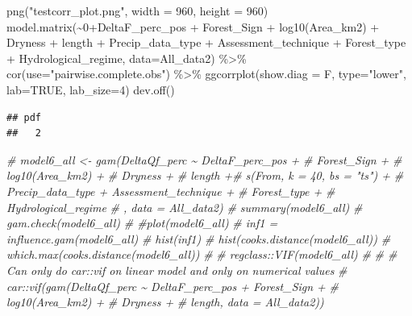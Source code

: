 \documentclass[]{elsarticle} %
\newenvironment{Shaded}{\begin{snugshade}}{\end{snugshade}}
\newcommand{\AttributeTok}[1]{\textcolor[rgb]{0.77,0.63,0.00}{#1}}
\newcommand{\CommentTok}[1]{\textcolor[rgb]{0.56,0.35,0.01}{\textit{#1}}}
\newcommand{\ConstantTok}[1]{\textcolor[rgb]{0.00,0.00,0.00}{#1}}
\newcommand{\DecValTok}[1]{\textcolor[rgb]{0.00,0.00,0.81}{#1}}
\newcommand{\FunctionTok}[1]{\textcolor[rgb]{0.00,0.00,0.00}{#1}}
\newcommand{\NormalTok}[1]{#1}
\newcommand{\SpecialCharTok}[1]{\textcolor[rgb]{0.00,0.00,0.00}{#1}}
\newcommand{\StringTok}[1]{\textcolor[rgb]{0.31,0.60,0.02}{#1}}
\begin{document}
\begin{Shaded}
\begin{Highlighting}[]
\FunctionTok{png}\NormalTok{(}\StringTok{"testcorr\_plot.png"}\NormalTok{, }\AttributeTok{width =} \DecValTok{960}\NormalTok{, }\AttributeTok{height =} \DecValTok{960}\NormalTok{)}
\FunctionTok{model.matrix}\NormalTok{(}\SpecialCharTok{\textasciitilde{}}\DecValTok{0}\SpecialCharTok{+}\NormalTok{DeltaF\_perc\_pos }\SpecialCharTok{+} 
\NormalTok{                    Forest\_Sign }\SpecialCharTok{+} 
                   \FunctionTok{log10}\NormalTok{(Area\_km2) }\SpecialCharTok{+} 
\NormalTok{                    Dryness }\SpecialCharTok{+} 
\NormalTok{                    length }\SpecialCharTok{+}
\NormalTok{                    Precip\_data\_type }\SpecialCharTok{+}\NormalTok{  Assessment\_technique }\SpecialCharTok{+}
\NormalTok{                    Forest\_type }\SpecialCharTok{+}
\NormalTok{                    Hydrological\_regime, }\AttributeTok{data=}\NormalTok{All\_data2) }\SpecialCharTok{\%\textgreater{}\%} 
  \FunctionTok{cor}\NormalTok{(}\AttributeTok{use=}\StringTok{"pairwise.complete.obs"}\NormalTok{) }\SpecialCharTok{\%\textgreater{}\%} 
  \FunctionTok{ggcorrplot}\NormalTok{(}\AttributeTok{show.diag =}\NormalTok{ F, }\AttributeTok{type=}\StringTok{"lower"}\NormalTok{, }\AttributeTok{lab=}\ConstantTok{TRUE}\NormalTok{, }\AttributeTok{lab\_size=}\DecValTok{4}\NormalTok{)}
\FunctionTok{dev.off}\NormalTok{()}
\end{Highlighting}
\end{Shaded}

\begin{verbatim}
## pdf 
##   2
\end{verbatim}

\begin{Shaded}
\begin{Highlighting}[]
\CommentTok{\# model6\_all \textless{}{-} gam(DeltaQf\_perc \textasciitilde{} DeltaF\_perc\_pos + }
\CommentTok{\#                     Forest\_Sign + }
\CommentTok{\#                    log10(Area\_km2) + }
\CommentTok{\#                     Dryness + }
\CommentTok{\#                     length +\# s(From, k = 40, bs = "ts") +}
\CommentTok{\#                     Precip\_data\_type +  Assessment\_technique +}
\CommentTok{\#                     Forest\_type +}
\CommentTok{\#                     Hydrological\_regime}
\CommentTok{\#                     , data = All\_data2)}
\CommentTok{\# summary(model6\_all)}
\CommentTok{\# gam.check(model6\_all)}
\CommentTok{\# \#plot(model6\_all)}
\CommentTok{\# inf1 = influence.gam(model6\_all)}
\CommentTok{\# hist(inf1)}
\CommentTok{\# hist(cooks.distance(model6\_all))}
\CommentTok{\# which.max(cooks.distance(model6\_all))}
\CommentTok{\# }
\CommentTok{\# regclass::VIF(model6\_all)}
\CommentTok{\# }
\CommentTok{\# \# Can only do car::vif on linear model and only on numerical values}
\CommentTok{\# car::vif(gam(DeltaQf\_perc \textasciitilde{} DeltaF\_perc\_pos + Forest\_Sign + }
\CommentTok{\#                     log10(Area\_km2) + }
\CommentTok{\#                     Dryness + }
\CommentTok{\#                     length, data = All\_data2))}
\end{Highlighting}
\end{Shaded}
\end{document}
